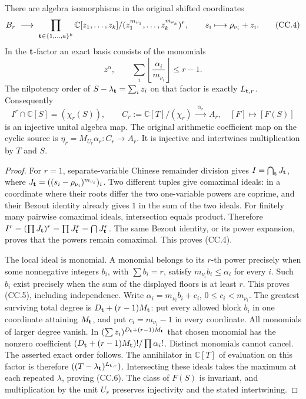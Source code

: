 \documentclass[11pt,a4paper]{article}
\begin{document}
\begin{theorem}
There are algebra isomorphisms in the original shifted coordinates
\[
 B_r\ \longrightarrow\
 \prod_{{\bf t}\in\{1,\ldots,a\}^k}
 \mathbb C[z_1,\ldots,z_k]/(z_1^{m_{\nu_1}},\ldots,z_k^{m_{\nu_k}})^r,
 \qquad s_i\longmapsto\rho_{\nu_i}+z_i.
 \tag{CC.4}
\]
In the \({\bf t}\)-factor an exact basis consists of the monomials
\[
 z^\alpha,\qquad
 \sum_i\left\lfloor\frac{\alpha_i}{m_{\nu_i}}\right\rfloor\leq r-1.
 \tag{CC.5}
\]
The nilpotency order of \(S-\lambda_{\bf t}=\sum_i z_i\) on that
factor is exactly \(L_{{\bf t},r}\).  Consequently
\[
 I^r\cap\mathbb C[S]=(\chi_r(S)),\qquad
 C_r:=\mathbb C[T]/(\chi_r)
 \ \xrightarrow{\ \alpha_r\ }\ A_r,\quad [F]\longmapsto[F(S)]
 \tag{CC.6}
\]
is an injective unital algebra map.  The original arithmetic coefficient
map on the cyclic source is
\(\eta_r=M_{U_r}\alpha_r:C_r\longrightarrow A_r\).
It is injective and intertwines multiplication by \(T\) and \(S\).
\end{theorem}
\begin{proof}
For \(r=1\), separate-variable Chinese remainder division gives
\(I=\bigcap_{\bf t}J_{\bf t}\), where
\(J_{\bf t}=((s_i-\rho_{\nu_i})^{m_{\nu_i}})_i\).
Two different tuples give comaximal ideals: in a coordinate where
their roots differ the two one-variable powers are coprime, and their
Bezout identity already gives \(1\) in the sum of the two ideals.
For finitely many pairwise comaximal ideals, intersection equals
product.  Therefore
\(I^r=(\prod J_{\bf t})^r=\prod J_{\bf t}^r=\bigcap J_{\bf t}^r\).
The same Bezout identity, or its power expansion, proves that the
powers remain comaximal.  This proves (CC.4).

The local ideal is monomial.  A monomial belongs to its \(r\)-th
power precisely when some nonnegative integers \(b_i\), with
\(\sum b_i=r\), satisfy \(m_{\nu_i}b_i\leq\alpha_i\) for every \(i\).
Such \(b_i\) exist precisely when the sum of the displayed floors is
at least \(r\).  This proves (CC.5), including independence.
Write \(\alpha_i=m_{\nu_i}b_i+c_i\), \(0\leq c_i<m_{\nu_i}\).
The greatest surviving total degree is
\(D_{\bf t}+(r-1)M_{\bf t}\): put every allowed block \(b_i\)
in one coordinate attaining \(M_{\bf t}\), and put
\(c_i=m_{\nu_i}-1\) in every coordinate.
All monomials of larger degree vanish.  In
\((\sum z_i)^{D_{\bf t}+(r-1)M_{\bf t}}\) that chosen monomial
has the nonzero coefficient
\((D_{\bf t}+(r-1)M_{\bf t})!/\prod\alpha_i!\).
Distinct monomials cannot cancel.  The asserted exact order follows.
The annihilator in \(\mathbb C[T]\) of evaluation on this factor is
therefore \(((T-\lambda_{\bf t})^{L_{{\bf t},r}})\).
Intersecting these ideals takes the maximum at each repeated
\(\lambda\), proving (CC.6).  The class of \(F(S)\) is invariant,
and multiplication by the unit \(U_r\) preserves injectivity and
the stated intertwining.
\end{proof}
\end{document}
